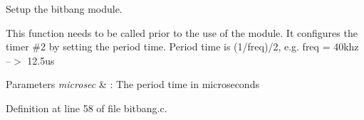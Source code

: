 Setup the bitbang module. 

This function needs to be called prior to the use of the module. It configures the timer \#2 by setting the period time. Period time is (1/freq)/2, e.\-g. freq = 40khz --$>$ 12.\-5us


\begin{DoxyParams}{Parameters}
{\em microsec} & \-: The period time in microseconds \\
\hline
\end{DoxyParams}


Definition at line 58 of file bitbang.\-c.


